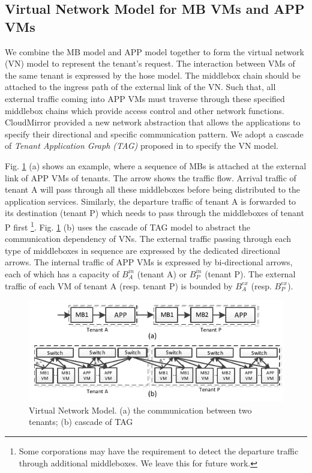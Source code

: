 \documentclass[review]{elsarticle}
\begin{document}
\subsection{Virtual Network Model for MB VMs and APP VMs} 
We combine the MB model and APP model together to form the virtual network (VN) model to represent the tenant's request. The interaction between VMs of the same tenant is expressed by the hose model. The middlebox chain should be attached to the ingress path of the external link of the VN. Such that, all external traffic coming into APP VMs must traverse through these specified middlebox chains which provide access control and other network functions. CloudMirror \cite{cloudmirror} provided a new network abstraction that allows the applications to specify their directional and specific communication pattern. We adopt a cascade of \emph{Tenant Application Graph (TAG)} proposed in \cite{cloudmirror} to specify the VN model. 

Fig. \ref{fig:abstraction} (a) shows an example, where a sequence of MBs is attached at the external link of APP VMs of tenants. The arrow shows the traffic flow. Arrival traffic of tenant A will pass through all these middleboxes before being distributed to the application services. Similarly,  the departure traffic of tenant A is forwarded to its destination (tenant P) which needs to pass through the middleboxes of tenant P first \footnote{Some corporations may have the requirement to detect the departure traffic through additional middleboxes. We leave this for future work. }.  Fig. \ref{fig:abstraction} (b) uses the cascade of TAG model to abstract the communication dependency of VNs. The external traffic passing through each type of middleboxes in sequence are expressed by the dedicated directional arrows. The internal traffic of APP VMs is expressed by bi-directional arrows, each of which has a capacity of $B_{A}^{in}$ (tenant A) or $B_{P}^{in}$ (tenant P). The external traffic of each VM of tenant A (resp. tenant P) is bounded by $B_{A}^{ex}$ (resp. $B_{P}^{ex}$). 
\begin{figure}
	\centering
		\includegraphics[width=3.5 in]{fig/abstraction.pdf}
	\caption{Virtual Network Model. (a) the communication between two tenants; (b) cascade of TAG}
	\label{fig:abstraction}
\end{figure}
\end{document}
